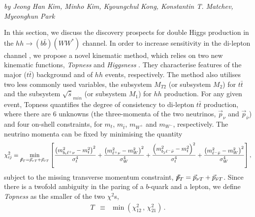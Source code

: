 \begin{center}
\textit{by Jeong Han Kim, Minho Kim, Kyoungchul Kong, Konstantin
  T. Matchev, Myeonghun Park}
\end{center}


In this section, we discuss the discovery prospects for double Higgs production in the $hh \to (b\bar b) (W W^*)$ channel. In order to increase sensitivity in the di-lepton channel \cite{CMS:2015nat,CMS:2017cwx,Adhikary:2017jtu}, we propose a novel kinematic method, which relies on two new kinematic functions, {\it Topness} and {\it Higgsness} \cite{Kim:2018cxf}. They characterise features of the major ($t\bar t$) background and of $hh$ events, respectively. The method also utilises two less commonly used variables, the subsystem $M_{T2}$ (or subsystem $M_2$) \cite{Lester:1999tx,Burns:2008va,Barr:2011xt} for $t\bar t$ and the subsystem $\sqrt{\hat {s}}_{min}$ (or subsystem $M_1$) \cite{Konar:2008ei,Konar:2010ma,Barr:2011xt} for $hh$ production.
%
For any given event, Topness \cite{Graesser:2012qy,Kim:2018cxf} quantifies the degree of consistency to di-lepton $t\bar t$ production, where there are 6 unknowns (the three-momenta of the two neutrinos, $\vec p_{\nu}$ and $\vec p_{\bar\nu}$) and four on-shell constraints, for
$m_t$, $m_{\bar t}$, $m_{W^+}$ and $m_{W^-}$, respectively. The neutrino momenta can be fixed by minimising the quantity 
%
\begin{eqnarray}
\chi^2_{ij} \equiv \min_{\tiny {/\!\!\!\vec{ p}_T} = \vec p_{\nu T} + \vec p_{ \bar\nu T}}  \left [ 
\frac{\left ( m^2_{b_i \ell^+ \nu} - m^2_t \right )^2}{\sigma_t^4}    +
\frac{\left ( m^2_{\ell^+ \nu} - m^2_W \right )^2}{\sigma_W^4}   \label{eq:tt}  
 + \frac{\left ( m^2_{b_j \ell^- \bar \nu} - m^2_t \right )^2}{\sigma_t^4}  +
\frac{\left ( m^2_{\ell^- \bar\nu} - m^2_W \right )^2}{\sigma_W^4}   \right ]  , 
\end{eqnarray}
%
subject to the missing transverse momentum constraint, $ {/\!\!\!\vec{ p}_T} = \vec p_{\nu T} + \vec p_{ \bar\nu T}$. 
Since there is a twofold ambiguity in the paring of a $b$-quark and a lepton, we define {\it Topness} as the smaller of the two $\chi^2$s,
\begin{eqnarray}
T &\equiv&  { \min} \left ( \chi^2_{12} \, , \, \chi^2_{21} \right ) \, .
\end{eqnarray}

